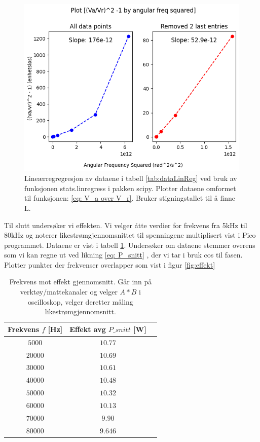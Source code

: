 \documentclass[norsk,a4paper,12pt]{article}
\begin{document}
\begin{figure}[htbp]
    \centering
    \includegraphics[width=1\textwidth]{Figs/linreg.png}
    \caption{Lineærregregresjon av dataene i tabell \ref{tab:dataLinReg} ved bruk av funksjonen stats.linregress i pakken scipy. Plotter dataene omformet til funksjonen: \ref{eq: V_a over V_r}. Bruker stigningstallet til å finne L.}
    \label{fig:linreg}
\end{figure}


Til slutt undersøker vi effekten. Vi velger åtte verdier for frekvens fra 5kHz til 80kHz og noterer likestrømgjennomsnittet til spenningene multiplisert vist i Pico programmet. Dataene er vist i tabell \ref{tab:effekt}. Undersøker om dataene stemmer overens som vi kan regne ut ved likning \ref{eq: P_snitt} , der vi tar i bruk cos til fasen. Plotter punkter der frekvenser overlapper som vist i figur \ref{fig:effekt}

\begin{table}[htbp]
    \centering
    \caption{Frekvens mot effekt gjennomsnitt. Går inn på verktøy/mattekanaler og velger $A*B$ i oscilloskop, velger deretter måling likestrømgjennomsnitt.}
    \begin{tabular}{ccc}
    \hline
    \textbf{Frekvens $f$ [Hz]} & \textbf{Effekt avg $P\_ snitt$ [W]} \\
    \hline
    $5 000$ & $10.77$ \\
    \hline
    $20 000$ & $10.69$ \\
    \hline
    $30 000$ & $10.61$ \\
    \hline
    $40 000$ & $10.48$ \\
    \hline
    $50 000$ & $10.32$ \\
    \hline
    $60 000$ & $10.13$ \\
    \hline
    $70 000$ & $9.90$ \\
    \hline
    $80 000$ & $9.646$ \\
    \hline
    \end{tabular}
    \label{tab:effekt}
\end{table}
\end{document}
